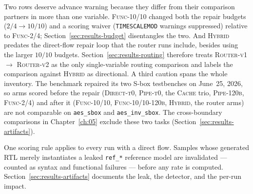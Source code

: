 Two rows deserve advance warning because they differ from their comparison
partners in more than one variable. \textsc{Func-10/10} changed both the
repair budgets ($2/4 \to 10/10$) and a scoring waiver
(\texttt{TIMESCALEMOD} warnings suppressed) relative to \textsc{Func-2/4};
Section~\ref{sec:results-budget} disentangles the two. And \textsc{Hybrid}
predates the direct-flow repair loop that the router runs include, besides
using the larger $10/10$ budgets. Section~\ref{sec:results-routing}
therefore treats \textsc{Router-v1} $\to$ \textsc{Router-v2} as the only
single-variable routing comparison and labels the comparison against
\textsc{Hybrid} as directional. A third caution spans the whole
inventory. The benchmark repaired its two S-box testbenches on
June~25, 2026, so arms scored before the repair (\textsc{Direct-t0},
\textsc{Pipe-t0}, the \textsc{Cache} trio, \textsc{Pipe-120b},
\textsc{Func-2/4}) and after it (\textsc{Func-10/10},
\textsc{Func-10/10-120b}, \textsc{Hybrid},
the router arms) are not comparable on \texttt{aes\_sbox} and
\texttt{aes\_inv\_sbox}. The cross-boundary comparisons in
Chapter~\ref{ch:05} exclude these two tasks
(Section~\ref{sec:results-artifacts}).

One scoring rule applies to every run with a direct flow. Samples whose
generated RTL merely instantiates a leaked \texttt{ref\_*} reference
model are invalidated --- counted as syntax and functional failures ---
before any rate is computed. Section~\ref{sec:results-artifacts}
documents the leak, the detector, and the per-run impact.
